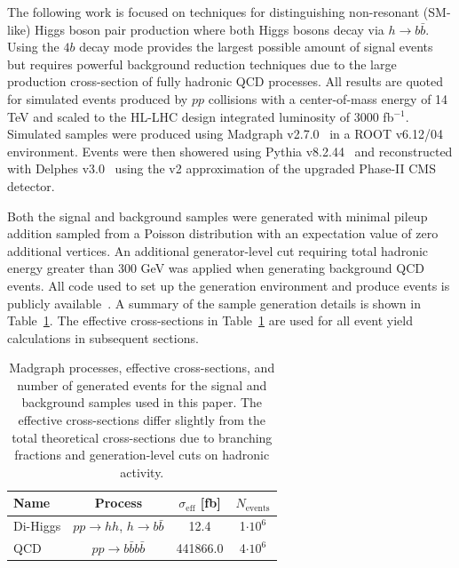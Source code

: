 The following work is focused on techniques for distinguishing non-resonant (SM-like) Higgs boson pair production where both Higgs bosons decay via $h \to b \bar{b}$. Using the $4b$ decay mode provides the largest possible amount of signal events but requires powerful background reduction techniques due to the large production cross-section of fully hadronic QCD processes. All results are quoted for simulated events produced by $pp$ collisions with a center-of-mass energy of 14 TeV and scaled to the HL-LHC design integrated luminosity of 3000 fb$^{-1}$. Simulated samples were produced using Madgraph v2.7.0~\cite{Alwall:2014hca} in a ROOT v6.12/04~\cite{Brun:1997pa} environment. Events were then showered using Pythia v8.2.44~\cite{Sj_strand_2015} and reconstructed with Delphes v3.0~\cite{de_Favereau_2014} using the v2 approximation of the upgraded Phase-II CMS detector.

Both the signal and background samples were generated with minimal pileup addition sampled from a Poisson distribution with an expectation value of zero additional vertices. An additional generator-level cut requiring total hadronic energy greater than 300 GeV was applied when generating background QCD events. All code used to set up the generation environment and produce events is publicly available~\cite{github}. A summary of the sample generation details is shown in Table~\ref{tab:samples}. The effective cross-sections in Table~\ref{tab:samples} are used for all event yield calculations in subsequent sections.

\begin{table}[ht!]
 \label{tab:samples}
\centering
    \begin{tabular}{|l|c|c|c|} %
      \hline\hline
      Name & Process & $\sigma_{\textrm{eff}}$ [fb] & $N_{\textrm{events}}$ \\
      \hline
      Di-Higgs & $p p \rightarrow h h$, $h \rightarrow b \bar{b}$ & 12.4 & 1$\cdot 10^6$ \\
      QCD     & $p p \rightarrow b \bar{b} b \bar{b}$ & 441866.0 & 4$\cdot 10^6$ \\
      \hline\hline
    \end{tabular}
\caption{Madgraph processes, effective cross-sections, and number of generated events for the signal and background samples used in this paper. The effective cross-sections differ slightly from the total theoretical cross-sections due to branching fractions and generation-level cuts on hadronic activity.}
\end{table}

